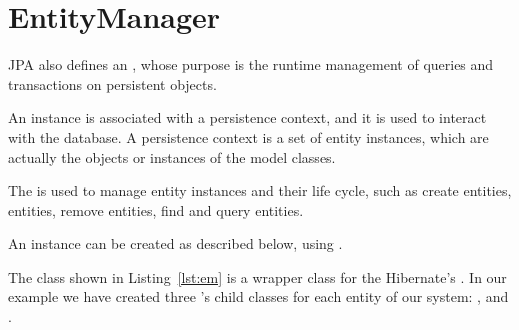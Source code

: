 \chapter{EntityManager}

JPA also defines an , whose purpose is the runtime
management of queries and transactions on persistent objects.

An  instance is associated with a persistence context, and
it is used to interact with the database. A persistence context is a set of
entity instances, which are actually the objects or instances of the model
classes.

The  is used to manage entity instances and their life
cycle, such as create entities, entities, remove entities, find and query
entities.

An  instance can be created as described below, using
.



The class shown in Listing~\ref{lst:em} is a wrapper class for the Hibernate's
. In our example we have created three
's child classes for each entity of our system:
,  and .
